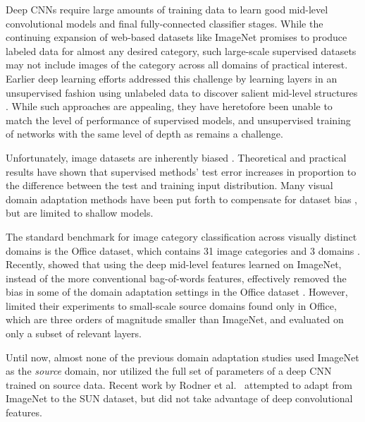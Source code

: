 Deep CNNs require large amounts of training data to learn
good mid-level convolutional models and final fully-connected classifier
stages. While the continuing expansion of web-based datasets like
ImageNet \cite{ilsvrc2012} promises to produce labeled data for almost any desired
category, such large-scale supervised datasets
may not include images of the category across all
domains of practical interest. Earlier deep learning efforts addressed this
challenge by learning layers in an unsupervised fashion using unlabeled data to
discover salient mid-level structures \cite{coates-nips12, dean-nips12}. While such approaches are appealing, they
have heretofore been unable to match the level of performance of supervised
models, and unsupervised training of networks with the same level of depth
as \cite{supervision} remains a challenge.

 
Unfortunately, image datasets are inherently biased \cite{efros-cvpr11}. 
Theoretical \cite{ben2007analysis, blitzer2007learning} and practical results \cite{saenko-eccv10,efros-cvpr11} have shown that supervised methods' test error increases in proportion to the difference between the test and training input distribution. 
Many visual domain adaptation methods have been put forth to compensate for dataset bias \cite{daume,yang-icdm07,aytar-iccv11,saenko-eccv10,kulis-cvpr11,Khosla-eccv12,gopalan-iccv11,gong-cvpr12,hoffman-eccv12,hoffman-iclr13}, but are limited to shallow models. 

The standard benchmark for image category classification across visually distinct domains is the Office dataset, which contains 31 image categories and 3 domains \cite{saenko-eccv10}. 
Recently, \cite{deeplearning-arxiv-2013} showed that using the deep mid-level features learned on ImageNet, instead of the more conventional bag-of-words features, effectively removed the bias in some of the domain adaptation settings in the Office dataset \cite{saenko-eccv10}.
However, \cite{deeplearning-arxiv-2013} limited their experiments to
small-scale source domains found only in Office, which are three orders of magnitude smaller than ImageNet, and evaluated on only a subset
of relevant layers.

Until now, almost none of the previous domain adaptation studies used ImageNet as the \textit{source} domain, nor utilized the full set of parameters of a deep CNN trained on source data. Recent work by Rodner et al.~\cite{rodner-arxiv13} attempted to adapt from ImageNet to the SUN dataset, but did not take advantage of deep convolutional features. 

